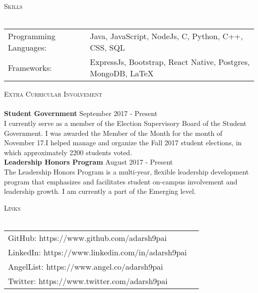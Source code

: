 \documentclass[a4paper]{article}
\newcommand{\lineunder} {
    \vspace*{-8pt} \\
    \hspace*{-18pt} \hrulefill \\
}
\newcommand{\header} [1] {
    {\hspace*{-18pt}\vspace*{6pt} \textsc{#1}}
    \vspace*{-6pt} \lineunder
}
\begin{document}
\header{Skills}
\begin{tabular}{ l l }
	Programming Languages: & Java, JavaScript, NodeJs, C, Python, C++, CSS, SQL    \\
	Frameworks:            & ExpressJs, Bootstrap, React Native, Postgres, MongoDB, LaTeX \\
\end{tabular}
\vspace{2mm}


\header{Extra Curricular Involvement}
\textbf{Student Government} \hfill September 2017 - Present\\
I currently serve as a member of the Election Supervisory Board of the Student Government. I was awarded the Member of the Month for the month of November \textquotesingle{}17.I helped manage and organize the Fall 2017 student elections, in which approximately 2200 students voted.\\
\vspace*{2mm}
\textbf{Leadership Honors Program} \hfill August 2017 - Present\\
The Leadership Honors Program is a multi-year, flexible leadership development program that emphasizes and facilitates student on-campus involvement and leadership growth. I am currently a part of the Emerging level.\\
\vspace*{2mm}

\header{Links}
\vspace{2mm} 
\begin{tabular}{ l l }
	GitHub: https://www.github.com/adarsh9pai   \\
    LinkedIn: https://www.linkedin.com/in/adarsh9pai   \\
    AngelList: https://www.angel.co/adarsh9pai   \\
    Twitter: https://www.twitter.com/adarsh9pai   \\
	
\end{tabular}
\vspace{2mm}

\ 
\end{document}
